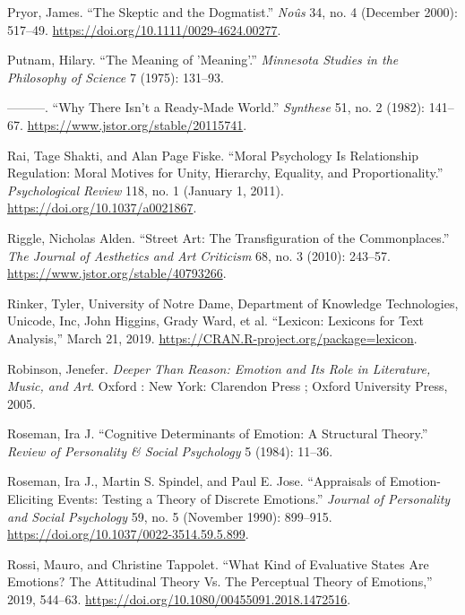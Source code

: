 \documentclass[phdthesis,12pt,final]{wuthesis}
\newlength{\cslhangindent}
\newenvironment{CSLReferences}[2] %
{\begin{list}{}{%
	\setlength{\itemindent}{0pt}
	\setlength{\leftmargin}{0pt}
	\setlength{\parsep}{0pt}
	\ifodd #1
	\setlength{\leftmargin}{\cslhangindent}
	\setlength{\itemindent}{-1\cslhangindent}
	\fi
	\setlength{\itemsep}{#2\baselineskip}}}
{\end{list}}
\theoremstyle{definition}
\theoremstyle{definition}
\theoremstyle{definition}
\theoremstyle{definition}
\theoremstyle{remark}
\begin{document}
\begin{CSLReferences}{1}{0}
Pryor, James. {``The {Skeptic} and the {Dogmatist}.''} \emph{Noûs} 34, no. 4 (December 2000): 517--49. \url{https://doi.org/10.1111/0029-4624.00277}.

Putnam, Hilary. {``The {Meaning} of '{Meaning}'.''} \emph{Minnesota Studies in the Philosophy of Science} 7 (1975): 131--93.

---------. {``Why {There Isn}'t a {Ready-Made World}.''} \emph{Synthese} 51, no. 2 (1982): 141--67. \url{https://www.jstor.org/stable/20115741}.

Rai, Tage Shakti, and Alan Page Fiske. {``Moral Psychology Is Relationship Regulation: Moral Motives for Unity, Hierarchy, Equality, and Proportionality.''} \emph{Psychological Review} 118, no. 1 (January 1, 2011). \url{https://doi.org/10.1037/a0021867}.

Riggle, Nicholas Alden. {``Street {Art}: {The Transfiguration} of the {Commonplaces}.''} \emph{The Journal of Aesthetics and Art Criticism} 68, no. 3 (2010): 243--57. \url{https://www.jstor.org/stable/40793266}.

Rinker, Tyler, University of Notre Dame, Department of Knowledge Technologies, Unicode, Inc, John Higgins, Grady Ward, et al. {``Lexicon: {Lexicons} for {Text Analysis},''} March 21, 2019. \url{https://CRAN.R-project.org/package=lexicon}.

Robinson, Jenefer. \emph{Deeper Than Reason: Emotion and Its Role in Literature, Music, and Art}. Oxford : New York: Clarendon Press ; Oxford University Press, 2005.

Roseman, Ira J. {``Cognitive Determinants of Emotion: {A} Structural Theory.''} \emph{Review of Personality \& Social Psychology} 5 (1984): 11--36.

Roseman, Ira J., Martin S. Spindel, and Paul E. Jose. {``Appraisals of Emotion-Eliciting Events: {Testing} a Theory of Discrete Emotions.''} \emph{Journal of Personality and Social Psychology} 59, no. 5 (November 1990): 899--915. \url{https://doi.org/10.1037/0022-3514.59.5.899}.

Rossi, Mauro, and Christine Tappolet. {``What {Kind} of {Evaluative States Are Emotions}? {The Attitudinal Theory Vs}. {The Perceptual Theory} of {Emotions},''} 2019, 544--63. \url{https://doi.org/10.1080/00455091.2018.1472516}.


\end{CSLReferences}
\end{document}
